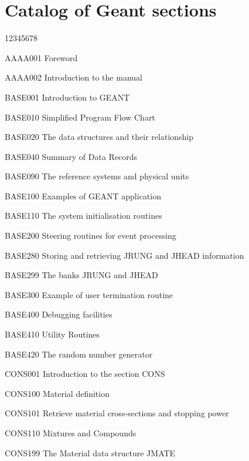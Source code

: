 \chapter{Catalog of Geant sections}
\begin{DLtt}{12345678}
\item[AAAA001] Foreword
\item[AAAA002] Introduction to the manual
\item[BASE001] Introduction to GEANT
\item[BASE010] Simplified Program Flow Chart
\item[BASE020] The data structures and their relationship
\item[BASE040] Summary of Data Records
\item[BASE090] The reference systems and physical units
\item[BASE100] Examples of GEANT application
\item[BASE110] The system initialisation routines
\item[BASE200] Steering routines for event processing
\item[BASE280] Storing and retrieving JRUNG and JHEAD information
\item[BASE299] The banks JRUNG and JHEAD
\item[BASE300] Example of user termination routine
\item[BASE400] Debugging facilities
\item[BASE410] Utility Routines
\item[BASE420] The random number generator
\item[CONS001] Introduction to the section CONS
\item[CONS100] Material definition
\item[CONS101] Retrieve material cross-sections and stopping power
\item[CONS110] Mixtures and Compounds
\item[CONS199] The Material data structure JMATE

\end{DLtt}
